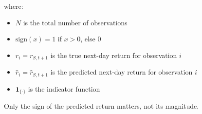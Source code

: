 where:
\begin{itemize}
      \item $N$ is the total number of observations
      \item $\text{sign}(x) = 1$ if $x > 0$, else $0$
      \item $r_i = r_{S,t+1}$ is the true next-day return for observation $i$
      \item $\hat{r}_i = \hat{r}_{S,t+1}$ is the predicted next-day return for observation $i$
      \item $\mathbf{1}_{\{\cdot\}}$ is the indicator function
\end{itemize}

Only the sign of the predicted return matters, not its magnitude.






